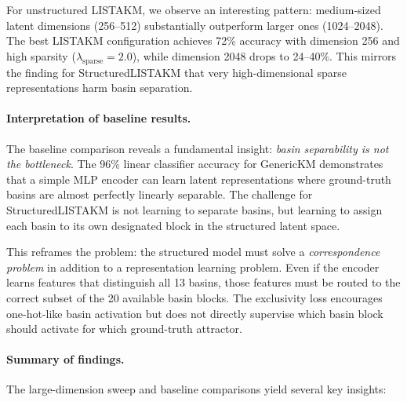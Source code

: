 For unstructured LISTAKM, we observe an interesting pattern: medium-sized latent dimensions (256--512) substantially outperform larger ones (1024--2048). The best LISTAKM configuration achieves 72\% accuracy with dimension 256 and high sparsity ($\lambda_{\text{sparse}} = 2.0$), while dimension 2048 drops to 24--40\%. This mirrors the finding for StructuredLISTAKM that very high-dimensional sparse representations harm basin separation.

\paragraph{Interpretation of baseline results.}
The baseline comparison reveals a fundamental insight: \emph{basin separability is not the bottleneck}. The 96\% linear classifier accuracy for GenericKM demonstrates that a simple MLP encoder can learn latent representations where ground-truth basins are almost perfectly linearly separable. The challenge for StructuredLISTAKM is not learning to separate basins, but learning to assign each basin to its own designated block in the structured latent space.

This reframes the problem: the structured model must solve a \emph{correspondence problem} in addition to a representation learning problem. Even if the encoder learns features that distinguish all 13 basins, those features must be routed to the correct subset of the 20 available basin blocks. The exclusivity loss encourages one-hot-like basin activation but does not directly supervise which basin block should activate for which ground-truth attractor.

\paragraph{Summary of findings.}
The large-dimension sweep and baseline comparisons yield several key insights:

